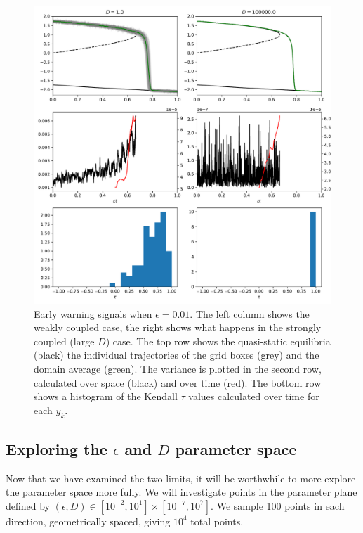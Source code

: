     \begin{figure}
      \centering
      \includegraphics[width=\textwidth,keepaspectratio]{coupled_variance}
      \caption[Early Warning Signals in the slowly forced limit]{Early warning signals when $\epsilon = 0.01$. The left column shows 
                the weakly coupled case, the right shows what happens in the strongly coupled (large $D$) case. 
                The top row shows the quasi-static equilibria (black) the individual
                trajectories of the grid boxes (grey) and the domain average (green).
			      The variance is plotted in the second row, calculated over space 
                (black) and over time (red). The bottom row shows a histogram of the Kendall $\tau$ values calculated over time for each $y_k$.}
              \label{fig:coupled_timeseries}
    \end{figure}
    \subsection{Exploring the $\epsilon$ and $D$ parameter space}
    Now that we have examined the two limits, it will be worthwhile to more explore the parameter space more fully.
    We will investigate points in the parameter plane defined by $(\epsilon,D) \in [10^{-2},10^1] \times [10^{-7},10^{7}]$.
    We sample 100 points in each direction, geometrically spaced, giving $10^4$ total points.

